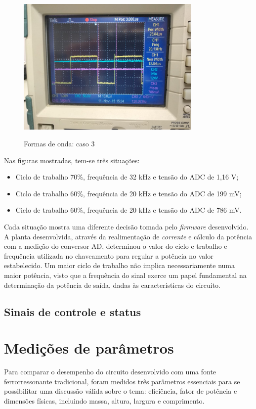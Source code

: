 \begin{figure}[H]
    \centering
    \caption{Formas de onda: caso 3}
    \includegraphics[width=0.8\textwidth]{./dados/figuras/onda_controller_3}
    \label{fig:figura-onda_controller_3}
\end{figure}

Nas figuras mostradas, tem-se três situações: 
\bigskip
\begin{itemize}
    \item Ciclo de trabalho 70\%, frequência de 32 kHz e tensão do ADC de 1,16 V;
    \item Ciclo de trabalho 60\%, frequência de 20 kHz e tensão do ADC de 199 mV;
    \item Ciclo de trabalho 60\%, frequência de 20 kHz e tensão do ADC de 786 mV.
\end{itemize}
\bigskip

Cada situação mostra uma diferente decisão tomada pelo \textit{firmware} desenvolvido. A planta desenvolvida, através da realimentação de \textit{corrente} e cálculo da potência com a medição do conversor AD, determinou o valor do ciclo e trabalho e frequência utilizada no chaveamento para regular a potência no valor estabelecido. Um maior ciclo de trabalho não implica necessariamente numa maior potência, visto que a frequência do sinal exerce um papel fundamental na determinação da potência de saída, dadas às características do circuito.

\subsection{Sinais de controle e status}


\section{Medições de parâmetros}
Para comparar o desempenho do circuito desenvolvido com uma fonte ferrorressonante tradicional, foram medidos três parâmetros essenciais para se possibilitar uma discussão válida sobre o tema: eficiência, fator de potência e dimensões físicas, incluindo massa, altura, largura e comprimento. 

